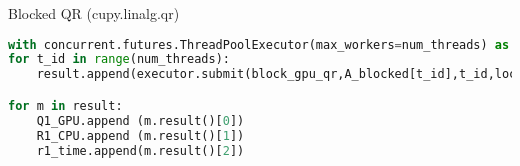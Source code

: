 \documentclass{beamer}
\begin{document}
\begin{frame}[fragile]{Blocked QR (cupy.linalg.qr)}
    \begin{table}[!tbhp]
        \begin{center}
        \end{center}
        \caption{Table presents the predicted QR1 runtime (see (\ref{eq:qr1_sm})) based on the empirically compute bandwidths and flops/s for matrix rows of $\frac{m}{p} \times n$, where $p$ denotes the number of GPUs used for the actual computation. The difference between the predicted and the reported runtime is almost a constant.\label{tb:qr1}}
    \end{table}
    \pause
    \begin{lstlisting}[language=Python, basicstyle=\tiny]
with concurrent.futures.ThreadPoolExecutor(max_workers=num_threads) as executor:
for t_id in range(num_threads):
    result.append(executor.submit(block_gpu_qr,A_blocked[t_id],t_id,loc))

for m in result:
    Q1_GPU.append (m.result()[0])
    R1_CPU.append (m.result()[1])
    r1_time.append(m.result()[2])
    \end{lstlisting}
\end{frame}
\end{document}
